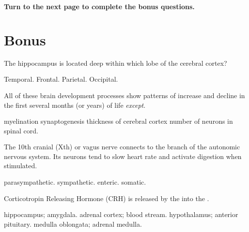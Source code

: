 \documentclass[answers]{exam}
\begin{document}
\begin{questions}
\vspace{2cm}
\begin{center}
\textbf{Turn to the next page to complete the bonus questions.}
\end{center}

\newpage
\section{Bonus}

\question The hippocampus is located deep within which lobe of the cerebral cortex?
\begin{choices}
\correctchoice Temporal.
\choice Frontal.
\choice Parietal.
\choice Occipital.
\end{choices}


\question All of these brain development processes show patterns of increase and decline in the first several months (or years) of life \emph{except}.
\begin{choices}
\correctchoice myelination
\choice synaptogenesis
\choice thickness of cerebral cortex
\choice number of neurons in spinal cord.
\end{choices}

\question The 10th cranial (Xth) or vagus nerve connects to the \fillin branch of the autonomic nervous system. Its neurons tend to slow heart rate and activate digestion when stimulated.
\begin{choices}
\correctchoice parasympathetic.
\choice sympathetic.
\choice enteric.
\choice somatic.
\end{choices}

\question Corticotropin Releasing Hormone (CRH) is released by the \fillin into the \fillin.
\begin{choices}
\choice hippocampus; amygdala.
\choice adrenal cortex; blood stream.
\correctchoice hypothalamus; anterior pituitary.
\choice medulla oblongata; adrenal medulla.
\end{choices}

\end{questions}
\end{document}
